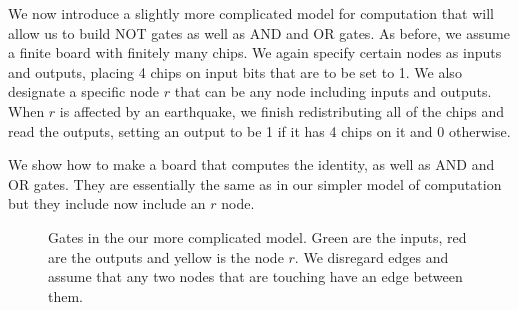 \documentclass[runningheads,a4paper]{llncs}
\begin{document}
We now introduce a slightly more complicated model for computation that will allow us to build NOT gates as well as AND and OR gates. As before, we assume a finite board with finitely many chips. We again specify certain nodes as inputs and outputs, placing 4 chips on input bits that are to be set to 1. We also designate a specific node $r$ that can be any node including inputs and outputs. When $r$ is affected by an earthquake, we finish redistributing all of the chips and read the outputs, setting an output to be 1 if it has 4 chips on it and 0 otherwise. 

We show how to make a board that computes the identity, as well as AND and OR gates. They are essentially the same as in our simpler model of computation but they include now include an $r$ node.

\begin{figure}
\centering
{}
\qquad\qquad
{}
\qquad\qquad
{}
\caption{Gates in the our more complicated model. Green are the inputs, red are the outputs and yellow is the node $r$. We disregard edges and assume that any two nodes that are touching have an edge between them.}
\label{fig:simplegateswithr}
\end{figure}


\end{document}
